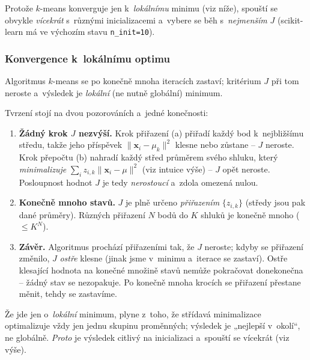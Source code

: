 \begin{poznamka}[Praxe]
Protože $k$-means konverguje jen k~\emph{lokálnímu} minimu (viz níže), spouští se obvykle \emph{vícekrát} s~různými inicializacemi a~vybere se běh s~\emph{nejmenším} $J$ (scikit-learn má ve výchozím stavu \texttt{n\_init=10}).
\end{poznamka}

\subsubsection*{Konvergence k~lokálnímu optimu}

\begin{veta}
Algoritmus $k$-means se po konečně mnoha iteracích zastaví; kritérium $J$ při tom neroste a~výsledek je \emph{lokální} (ne nutně globální) minimum.
\end{veta}

\begin{intuice}
Tvrzení stojí na dvou pozorováních a~jedné konečnosti:
\begin{enumerate}
  \item \textbf{Žádný krok $J$ nezvýší.} Krok přiřazení (a) přiřadí každý bod k~nejbližšímu středu, takže jeho příspěvek $\|\mathbf{x}_i-\mu_k\|^2$ klesne nebo zůstane -- $J$ neroste. Krok přepočtu (b) nahradí každý střed průměrem svého shluku, který \emph{minimalizuje} $\sum_i z_{i,k}\|\mathbf{x}_i-\mu\|^2$ (viz intuice výše) -- $J$ opět neroste. Posloupnost hodnot $J$ je tedy \emph{nerostoucí} a~zdola omezená nulou.
  \item \textbf{Konečně mnoho stavů.} $J$ je plně určeno \emph{přiřazením} $\{z_{i,k}\}$ (středy jsou pak dané průměry). Různých přiřazení $N$ bodů do $K$ shluků je konečně mnoho ($\le K^N$).
  \item \textbf{Závěr.} Algoritmus prochází přiřazeními tak, že $J$ neroste; kdyby se přiřazení změnilo, $J$ \emph{ostře} klesne (jinak jsme v~minimu a~iterace se zastaví). Ostře klesající hodnota na konečné množině stavů nemůže pokračovat donekonečna -- žádný stav se nezopakuje. Po konečně mnoha krocích se přiřazení přestane měnit, tehdy se zastavíme.
\end{enumerate}
Že jde jen o~\emph{lokální} minimum, plyne z~toho, že střídavá minimalizace optimalizuje vždy jen jednu skupinu proměnných; výsledek je „nejlepší v~okolí``, ne globálně. \emph{Proto} je výsledek citlivý na inicializaci a~spouští se vícekrát (viz výše).
\end{intuice}

